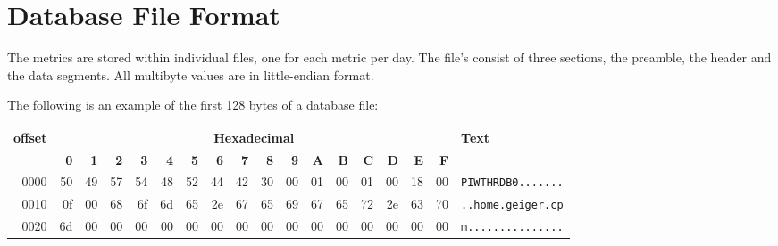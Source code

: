 \section{Database File Format}
\label{sec:database:format}

The metrics are stored within individual files, one for each metric per day.
The file's consist of three sections, the preamble, the header and the data segments.
All multibyte values are in little-endian format.

The following is an example of the first 128 bytes of a database file:

\begin{table}[h*)]
    \begin{tabular}{r|rrrrrrrrrrrrrrrr|l}
        \hline
        \multirow{2}{*}{\textbf{offset}}& \multicolumn{16}{c|}{\textbf{Hexadecimal}} & \multirow{2}{*}{\textbf{Text}} \\
         &  \textbf{0}&\textbf{1}&\textbf{2}&\textbf{3}&
            \textbf{4}&\textbf{5}&\textbf{6}&\textbf{7}&
            \textbf{8}&\textbf{9}&\textbf{A}&\textbf{B}&
            \textbf{C}&\textbf{D}&\textbf{E}&\textbf{F}& \\
        \hline
        0000 &
            \cellcolor{yellow}50 & \cellcolor{yellow}49 & \cellcolor{yellow}57 & \cellcolor{yellow}54 &
            \cellcolor{yellow}48 & \cellcolor{yellow}52 & \cellcolor{yellow}44 & \multicolumn{1}{r|}{\cellcolor{yellow}42} &
            \cellcolor{blue!25}30 & \multicolumn{1}{r|}{\cellcolor{blue!25}00} &
            \cellcolor{red!25}01 & \multicolumn{1}{r|}{\cellcolor{red!25}00} &
            \cellcolor{green!25}01 & \multicolumn{1}{r|}{\cellcolor{green!25}00} &
            \cellcolor{grey!10}18 & \cellcolor{grey!10}00 &
            \texttt{PIWTHRDB0.......}\\
        \hline
        0010 & \cellcolor{green!25}0f & \multicolumn{1}{r|}{\cellcolor{green!25}00} &
            \cellcolor{yellow}68 & \cellcolor{yellow}6f & \cellcolor{yellow}6d & \cellcolor{yellow}65 &
            \cellcolor{yellow}2e & \cellcolor{yellow}67 & \cellcolor{yellow}65 & \cellcolor{yellow}69 &
            \cellcolor{yellow}67 & \cellcolor{yellow}65 & \cellcolor{yellow}72 & \cellcolor{yellow}2e & \cellcolor{yellow}63 & \cellcolor{yellow}70 &
            \texttt{..home.geiger.cp}\\
            \cline{2-17}
        0020 &
        \multicolumn{1}{r|}{\cellcolor{yellow}6d} &
            00 & 00 & 00 & 00 & 00 & 00 & 00 & 00 & 00 & 00 & 00 & 00 & 00 & 00 & 00 & \texttt{m...............}\\

\end{tabular}
\end{table}
